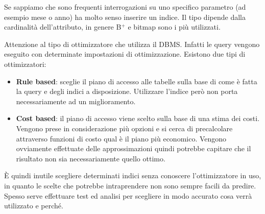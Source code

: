 \noindent Se sappiamo che sono frequenti interrogazioni su uno specifico parametro (ad esempio mese o anno) ha molto senso inserire un indice. Il tipo dipende dalla cardinalità dell'attributo, in genere B$^{+}$ e bitmap sono i più utilizzati.

\noindent Attenzione al tipo di ottimizzatore che utilizza il DBMS. Infatti le query vengono eseguito con determinate impostazioni di ottimizzazione. Esistono due tipi di ottimizzatori:
\begin{itemize}
	\item \textbf{Rule based}: sceglie il piano di accesso alle tabelle sulla base di come è fatta la query e degli indici a disposizione. Utilizzare l'indice però non porta necessariamente ad un miglioramento.
	\item \textbf{Cost based}: il piano di accesso viene scelto sulla base di una stima dei costi. Vengono prese in considerazione più opzioni e si cerca di precalcolare attraverso funzioni di costo qual è il piano più economico. Vengono ovviamente effettuate delle approssimazioni quindi potrebbe capitare che il risultato non sia necessariamente quello ottimo.
\end{itemize}
È quindi inutile scegliere determinati indici senza conoscere l'ottimizzatore in uso, in quanto le scelte che potrebbe intraprendere non sono sempre facili da predire. Spesso serve effettuare test ed analisi per scegliere in modo accurato cosa verrà utilizzato e perché.
